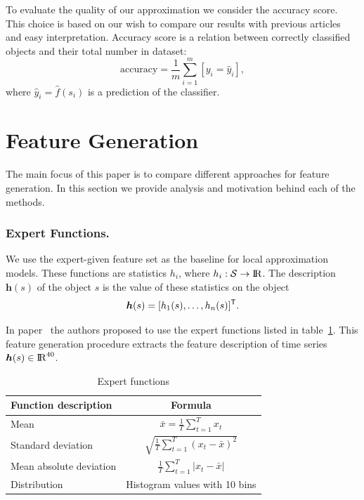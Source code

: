 \documentclass{llncs}
\newcommand{\T}{{\mbox{\scriptsize\sffamily\upshape\mdseries T}}}
\begin{document}
To evaluate the quality of our approximation we consider the accuracy score. 
This choice is based on our wish to compare our results with previous articles~\cite{karasikov2016feature, ivkin2015ts} and easy interpretation. 
Accuracy score is a relation between correctly classified objects and their total number in dataset:
\begin{equation*}
\mathrm{accuracy} = \frac{1}{m} \sum_{i=1}^{m} [y_i = \hat{y}_i],
\end{equation*}
where $\hat{y}_i = \hat{f}(s_i)$ is a prediction of the classifier. 

\section{Feature Generation}

The main focus of this paper is to compare different approaches for feature generation. In this section we provide analysis and motivation behind each of the methods.

\subsubsection{Expert Functions.}

We use the expert-given feature set as the baseline for local approximation models.
These functions are statistics $h_i$, where $h_i: \mathcal{S} \rightarrow {\rm I\!R}$.
The description $\bm{h}(s)$ of the object $s$ is the value of these statistics on the object 
\[
\bm{h}(s) = [h_1(s), \dots, h_n(s)]^{\T}.
\]

In paper~\cite{kwapisz2011activity} the authors proposed to use the expert functions listed in table~\ref{tbl::expert_functions}.
This feature generation procedure extracts the feature description of time series $\bm{h}(s) \in {\rm I\!R}^{40}$.

\begin{table}[h]
	\centering
	\caption{Expert functions}
	\begin{tabular}{|l|c|}
		\hline
		\textbf{Function description}    & \textbf{Formula} \\ \hline
		Mean                    & $\bar{x} = \frac{1}{T} \sum_{t=1}^{T} x_t$    \\ \hline
		Standard deviation      & $\sqrt{\frac{1}{T} \sum_{t=1}^{T} (x_t - \bar{x})^2}$    \\ \hline
		Mean absolute deviation & $\frac{1}{T} \sum_{t=1}^{T} |x_t - \bar{x}|$    \\ \hline
		Distribution            &  Histogram values with 10 bins    \\ \hline
	\end{tabular}
	\label{tbl::expert_functions}
\end{table}
\end{document}
